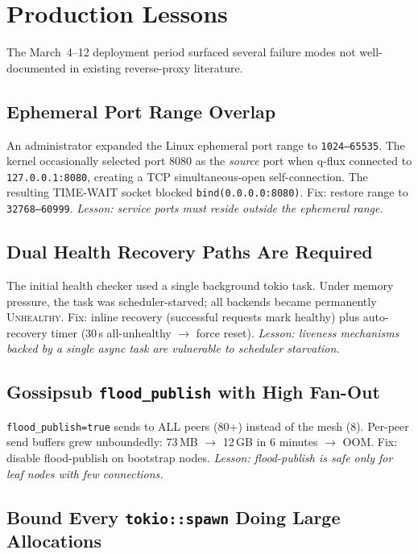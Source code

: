 \documentclass[a4paper, 11pt]{article}
\begin{document}

\section{Production Lessons}
\label{sec:lessons}

The March~4--12 deployment period surfaced several failure modes not well-documented in existing reverse-proxy literature.

\subsection{Ephemeral Port Range Overlap}

An administrator expanded the Linux ephemeral port range to \texttt{1024--65535}. The kernel occasionally selected port 8080 as the \emph{source} port when q-flux connected to \texttt{127.0.0.1:8080}, creating a TCP simultaneous-open self-connection. The resulting TIME-WAIT socket blocked \texttt{bind(0.0.0.0:8080)}. Fix: restore range to \texttt{32768--60999}. \emph{Lesson: service ports must reside outside the ephemeral range.}

\subsection{Dual Health Recovery Paths Are Required}

The initial health checker used a single background tokio task. Under memory pressure, the task was scheduler-starved; all backends became permanently \textsc{Unhealthy}. Fix: inline recovery (successful requests mark healthy) plus auto-recovery timer (30\,s all-unhealthy $\to$ force reset). \emph{Lesson: liveness mechanisms backed by a single async task are vulnerable to scheduler starvation.}

\subsection{Gossipsub \texttt{flood\_publish} with High Fan-Out}

\texttt{flood\_publish=true} sends to ALL peers (80+) instead of the mesh (8). Per-peer send buffers grew unboundedly: 73\,MB $\to$ 12\,GB in 6 minutes $\to$ OOM. Fix: disable flood-publish on bootstrap nodes. \emph{Lesson: flood-publish is safe only for leaf nodes with few connections.}

\subsection{Bound Every \texttt{tokio::spawn} Doing Large Allocations}
\end{document}
